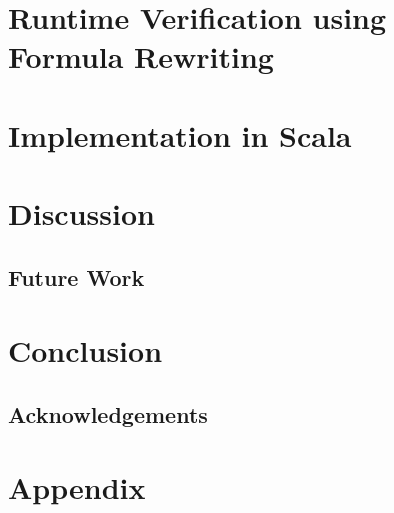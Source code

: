 \documentclass[a4paper]{article}
\begin{document}

\section{Runtime Verification using Formula Rewriting}
\section{Implementation in Scala}

\section{Discussion}
\subsection{Future Work}
\section{Conclusion}
\subsection{Acknowledgements}

\nocite{*}
\printbibliography{}
\newpage
\section{Appendix}\label{appendix}
\end{document}
